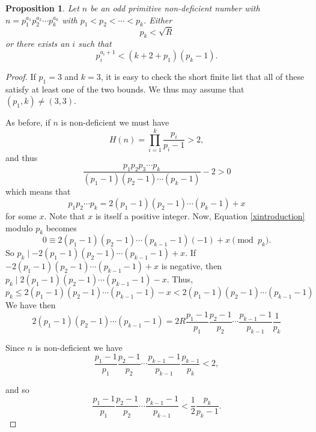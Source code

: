 \documentclass[12pt,reqno]{article}
\theoremstyle{plain}
\newtheorem{proposition}[theorem]{Proposition}
\theoremstyle{definition}
\theoremstyle{remark}
\begin{document}
\begin{proposition}  Let $n$ be an odd  primitive non-deficient number with $n=p_1^{a_1}p_2^{a_2} \cdots p_k^{a_k}$ with $p_1 < p_2 < \cdots < p_k$.
Either \begin{equation}p_k < \sqrt{R}\label{pklessthansquarerootofR}\end{equation} or there exists an $i$ such that \begin{equation}p_i^{a_i+1} < (k+2+p_1)(p_k-1).\label{mincomponentnotmuchbiggerthanlargestprimefactor}\end{equation}\label{dichotomywithpk}
\end{proposition}
\begin{proof} 

If $p_1=3$ and $k=3$, it is easy to check the short finite list that all of these satisfy at least one of the two bounds. We thus may assume that $(p_1, k) \neq (3,3)$.

As before, if $n$ is non-deficient we must have
$$H(n) = \prod_{i=1}^k \frac{p_i}{p_i-1} >2, $$
and thus 
$$\frac{p_1p_2p_3 \cdots p_k}{(p_1 -1)(p_2-1) \cdots (p_k-1)} -2 >0 $$
which means that \begin{equation}p_1p_2 \cdots p_k  = 2(p_1-1)(p_2-1)\cdots (p_k-1) +x \label{xintroduction} \end{equation} for some $x$. Note that $x$ is itself a positive integer. 
Now,  Equation \eqref{xintroduction} modulo $p_k$ becomes
$$0 \equiv 2(p_1-1)(p_2-1)\cdots(p_{k-1}-1)(-1) + x \pmod{p_k}.$$
So $p_k \mid -2(p_1-1)(p_2-1)\cdots(p_{k-1}-1) + x$.
If $-2(p_1-1)(p_2-1)\cdots(p_{k-1}-1) + x$ is negative, then
$p_k \mid 2(p_1-1)(p_2-1)\cdots(p_{k-1}-1) -x. $
Thus,
\begin{equation}p_k \leq 2(p_1-1)(p_2-1)\cdots(p_{k-1}-1) -x < 2(p_1-1)(p_2-1)\cdots(p_{k-1}-1) \label{initialpkinequalitytogetRform} \end{equation}
We have then 
\begin{equation} 2(p_1-1)(p_2-1)\cdots(p_{k-1}-1)= 2R\frac{p_1-1}{p_1}\frac{p_2-1}{p_2} \cdots \frac{p_{k-1}-1}{p_{k-1}}\frac{1}{p_k} \label{intermediateboundtogetRform}
\end{equation}

Since $n$ is non-deficient we have
$$\frac{p_1-1}{p_1}\frac{p_2-1}{p_2} \cdots \frac{p_{k-1}-1}{p_{k-1}}\frac{p_{k-1}}{p_{k}} <2, $$

and so 
\begin{equation} \frac{p_1-1}{p_1}\frac{p_2-1}{p_2} \cdots \frac{p_{k-1}-1}{p_{k-1}} < \frac{1}{2}\frac{p_k}{p_k-1} \label{withoutpkproductclosetoonehalf}.
\end{equation}


\end{proof}
\end{document}
